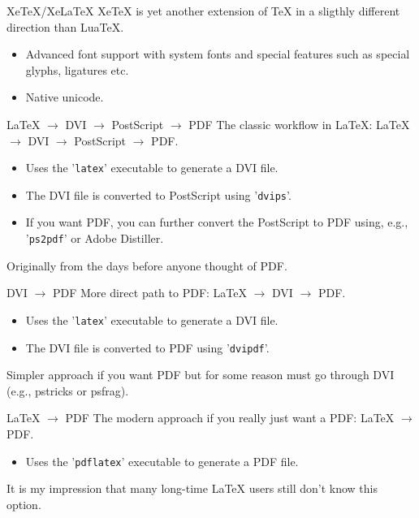 \documentclass[english]{beamer}
\begin{document}
\begin{frame}{\insertsection}{XeTeX/XeLaTeX}
  XeTeX is yet another extension of \TeX{} in a sligthly different
  direction than LuaTeX.
  \begin{itemize}
  \item Advanced font support with system fonts and special features
    such as special glyphs, ligatures etc.
  \item Native unicode.
  \end{itemize}
\end{frame}


\begin{frame}{\insertsection}{\LaTeX{} $\rightarrow$ DVI $\rightarrow$
    PostScript $\rightarrow$ PDF}
  The classic workflow in LaTeX: \LaTeX{} $\rightarrow$ DVI
  $\rightarrow$ PostScript $\rightarrow$ PDF.
  \begin{itemize}
  \item Uses the '\texttt{latex}' executable to generate a DVI file.
  \item The DVI file is converted to PostScript using '\texttt{dvips}'.
  \item If you want PDF, you can further convert the PostScript to PDF
    using, e.g., '\texttt{ps2pdf}' or Adobe Distiller.
  \end{itemize}
  Originally from the days before anyone thought of PDF.
\end{frame}

\begin{frame}{\insertsection}{DVI $\rightarrow$ PDF}
  More direct path to PDF: \LaTeX{} $\rightarrow$ DVI $\rightarrow$ PDF.
  \begin{itemize}
  \item Uses the '\texttt{latex}' executable to generate a DVI file.
  \item The DVI file is converted to PDF using '\texttt{dvipdf}'.
  \end{itemize}
  Simpler approach if you want PDF but for some reason must go through
  DVI (e.g., pstricks or psfrag).
\end{frame}

\begin{frame}{\insertsection}{\LaTeX{} $\rightarrow$ PDF}
  The modern approach if you really just want a PDF: \LaTeX{}
  $\rightarrow$ PDF.
  \begin{itemize}
  \item Uses the '\texttt{pdflatex}' executable to generate a PDF file.
  \end{itemize}
  It is my impression that many long-time \LaTeX{} users still don't
  know this option.
\end{frame}
\end{document}
